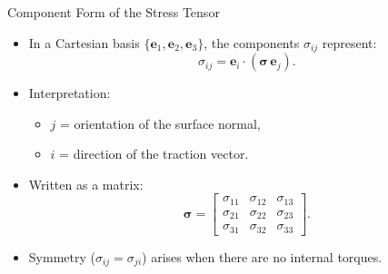 \documentclass{beamer}
\begin{document}
\begin{frame}{Component Form of the Stress Tensor}

\begin{itemize}

\item In a Cartesian basis $\{\mathbf{e}_1,\mathbf{e}_2,\mathbf{e}_3\}$,
the components $\sigma_{ij}$ represent:
\[
\sigma_{ij} = \mathbf{e}_i \cdot (\boldsymbol{\sigma} \,\mathbf{e}_j).
\]

\item Interpretation:
\begin{itemize}
  \item $j$ = orientation of the surface normal,
  \item $i$ = direction of the traction vector.
\end{itemize}

\item Written as a matrix:
\[
\boldsymbol{\sigma}
=
\begin{bmatrix}
\sigma_{11} & \sigma_{12} & \sigma_{13} \\
\sigma_{21} & \sigma_{22} & \sigma_{23} \\
\sigma_{31} & \sigma_{32} & \sigma_{33}
\end{bmatrix}.
\]

\item Symmetry (\(\sigma_{ij}=\sigma_{ji}\)) arises when there are no internal torques.
\end{itemize}

\end{frame}
\end{document}
